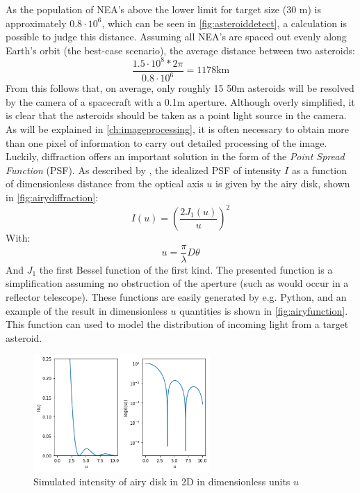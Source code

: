 As the population of NEA's above the lower limit for target size (30 m) is approximately $0.8\cdot10^6$, which can be seen in \autoref{fig:asteroiddetect}, a calculation is possible to judge this distance. Assuming all NEA's are spaced out evenly along Earth's orbit (the best-case scenario), the average distance between two asteroids:
\begin{equation}
    \frac{1.5\cdot 10^8 * 2 \pi}{0.8 \cdot 10^6} = 1178 \mathrm{km}
\end{equation}
From this follows that, on average, only roughly 15 50m asteroids will be resolved by the camera of a spacecraft with a 0.1m aperture. Although overly simplified, it is clear that the asteroids should be taken as a point light source in the camera. As will be explained in \autoref{ch:imageprocessing}, it is often necessary to obtain more than one pixel of information to carry out detailed processing of the image. Luckily, diffraction offers an important solution in the form of the \textit{Point Spread Function} (PSF). As described by \cite{airyfunction}, the idealized PSF of intensity $I$ as a function of dimensionless distance from the optical axis $u$ is given by the airy disk, shown in \autoref{fig:airydiffraction}:
\begin{equation}
    I(u) = \left(\frac{2J_1(u)}{u}\right)^2
\end{equation}
With:
\begin{equation}
    u = \frac{\pi}{\lambda}D\theta
\end{equation}
And $J_1$ the first Bessel function of the first kind. The presented function is a simplification assuming no obstruction of the aperture (such as would occur in a reflector telescope). These functions are easily generated by e.g. Python, and an example of the result in dimensionless $u$ quantities is shown in \autoref{fig:airyfunction}. This function can used to model the distribution of incoming light from a target asteroid.

\begin{figure}[htbp]
    \centering
    \includegraphics[width=0.6\textwidth]{images/airyfunction.png}
    \caption{Simulated intensity of airy disk in 2D in dimensionless units $u$}
    \label{fig:airyfunction}
\end{figure}

